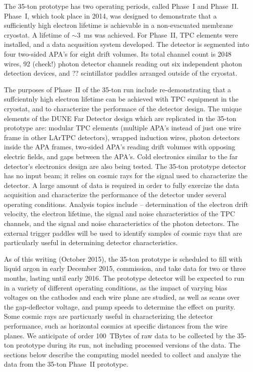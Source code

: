 \label{sec:35t}

The 35-ton prototype has two operating periods, called Phase~I and Phase~II.  Phase~I, which took place
in 2014, was designed to demonstrate that a sufficiently high electron lifetime is achievable in a non-evacuated
membrane cryostat. A lifetime of $\sim$3~ms was achieved.  For Phase~II, TPC elements were installed, and
a data acqusition system developed.  The detector is segmented into four two-sided APA's for eight drift volumes.
Its total channel count is 2048 wires, 92 (check!) photon detector channels reading out six independent photon
detection devices, and ?? scintillator paddles arranged outside of the cryostat.

The purposes of Phase~II of the 35-ton run include re-demonstrating that a suffcientnly high electron
lifetime can be achieved with TPC equipment in the cryostat, and to characterize the performace of the
detector design.  The unique elements of the DUNE Far Detector design which are replicated in the 35-ton
prototype are:  modular TPC elements (multiple APA's instead of just one wire frame in other LArTPC 
detectors), wrapped induction wires, photon detectors inside the APA frames, two-sided APA's reading
drift volumes with opposing electric fields, and gaps between the APA's.  Cold electronics similar to the
far detector's electronics design are also being tested.  The 35-ton prototype detector has no
input beam; it relies on cosmic rays for the signal used to characterize the detector.  A large amount
of data is required in order to fully exercize the data acquisition and characterize the 
performance of the detector under several operating conditions.  Analysis topics include --
determination of the electron drift velocity, the electron lifetime, the signal and noise characteristics
of the TPC channels, and the signal and noise characteristics of the photon detectors.  The external
trigger paddles will be used to identify samples of cosmic rays that are particularly useful in determining
detector characteristics.

As of this writing (October 2015), the 35-ton prototype is scheduled to fill with liquid argon
in early December 2015, commission, and take data for two or three months, lasting until early 2016.
The prototype detector will be expected to run in a variety of different operating conditions, as
the impact of varying bias voltages on the cathodes and each wire plane are studied, as well as
scans over the gap-deflector voltage, and pump speeds to determine the effect on purity.  Some cosmic
rays are particuarly useful in characterizing the detector performance, such as horizontal cosmics
at specific distances from the wire planes.  We anticipate of order 100~TBytes of raw data to be collected
by the 35-ton prototype during its run, not including processed versions of the data.
The sections below describe the computing model needed
to collect and analyze the data from the 35-ton Phase~II prototype.

